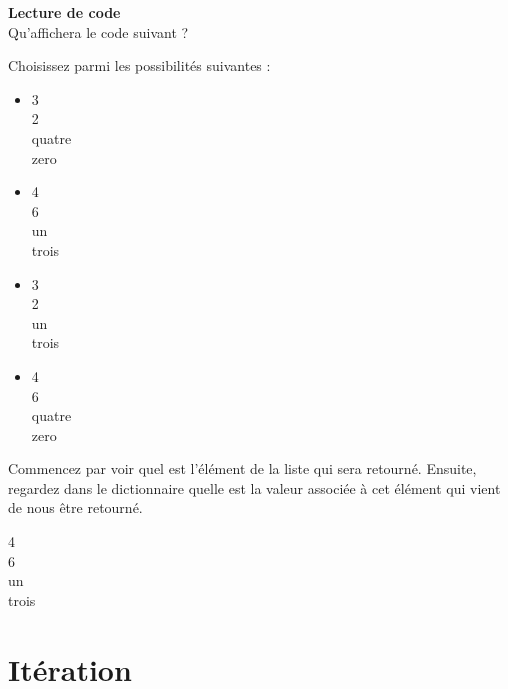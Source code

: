     \begin{Exercice}[15 minutes] \textbf{Lecture de code}\\
      	Qu'affichera le code suivant ?
      	
      	
      	
      	Choisissez parmi les possibilités suivantes :
      	
      	\begin{itemize}
      	\item 3 \\
      	2 \\
      	quatre \\
      	zero\\
      	\item 4 \\
      	6 \\
      	un \\
      	trois\\
      	\item 3 \\
      	2 \\
      	un \\
      	trois\\
      	\item 4 \\
      	6 \\
      	quatre \\
      	zero \\
      	\end{itemize}
    
        \begin{conseil}
           Commencez par voir quel est l'élément de la liste qui sera retourné. Ensuite, regardez dans le dictionnaire quelle est la valeur associée à cet élément qui vient de nous être retourné.		     
        \end{conseil}
        
        \begin{solution}
        4 \\
      	6 \\
      	un \\
      	trois
        \end{solution}
    \end{Exercice}
    
    \section{Itération}
    
